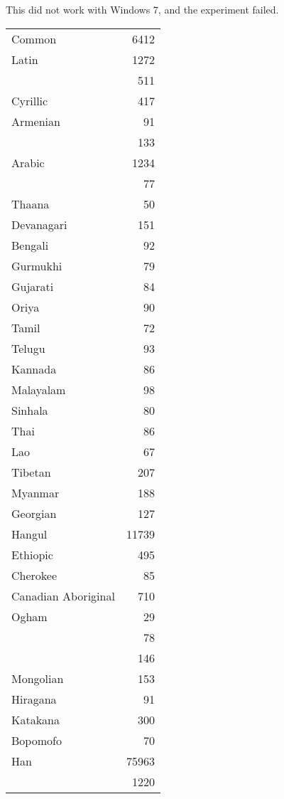 	
This did not work with Windows 7, and the experiment failed. 









\arial
\begin{longtable}{lr}
Common	&6412\\
Latin	&1272\\
\nameref{s:greek}	&511\\
Cyrillic	&417\\
Armenian	&91\\
\nameref{s:hebrew}	 &133\\
Arabic	 &1234\\
\nameref{s:syriac}	 &77\\
Thaana	 &50\\
Devanagari	&151\\
Bengali	&92\\
Gurmukhi	&79\\
Gujarati	&84\\
Oriya	&90\\
Tamil	&72\\
Telugu	&93\\
Kannada	&86\\
Malayalam	&98\\
Sinhala	&80\\
Thai	&86\\
Lao	 &67\\
Tibetan	&207\\
Myanmar	&188\\
Georgian	&127\\
Hangul	   &11739\\
Ethiopic	&495\\
Cherokee	&85\\
Canadian Aboriginal	 &710\\
Ogham	&29\\
\nameref{s:runic}	&78\\
\nameref{s:khmer}	&146\\
Mongolian	&153\\
Hiragana	&91\\
Katakana	&300\\
Bopomofo	&70\\
Han	 &75963\\
\nameref{s:yi}	&1220\\

\end{longtable}

